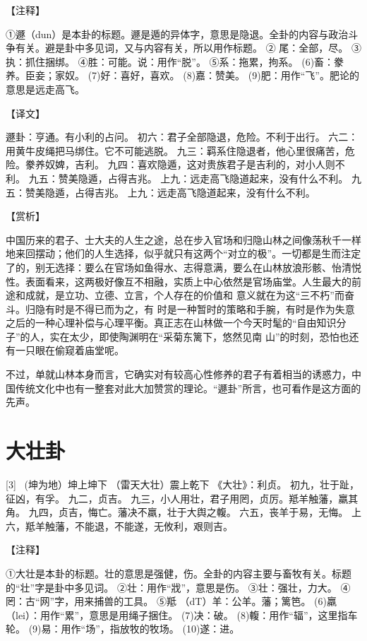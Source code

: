 \documentclass[12pt,UTF8]{ctexbook}
\begin{document}
【注释】

①遯（dun）是本卦的标题。遯是遁的异体字，意思是隐退。全卦的内容与政治斗争有关。避是卦中多见词，又与内容有关，所以用作标题。
② 尾：全部，尽。
③执：抓住捆绑。
④胜：可能。说：用作“脱”。
⑤系：拖累，拘系。
(6)畜：豢养。臣妾；家奴。
(7)好：喜好，喜欢。
(8)嘉：赞美。
(9)肥：用作“飞”。肥论的意思是远走高飞。

【译文】

遯卦：亨通。有小利的占问。
初六：君子全部隐退，危险。不利于出行。
六二：用黄牛皮绳把马绑住。它不可能逃脱。
九三：羁系住隐退者，他心里很痛苦，危险。豢养奴婢，吉利。
九四：喜欢隐遁，这对贵族君子是吉利的，对小人则不利。
九五：赞美隐遁，占得吉兆。
上九：远走高飞隐道起来，没有什么不利。
九五：赞美隐遁，占得吉兆。
上九：远走高飞隐道起来，没有什么不利。

【赏析】

中国历来的君子、士大夫的人生之途，总在步入官场和归隐山林之间像荡秋千一样地来回摆动；他们的人生选择，似乎就只有这两个“对立的极”。一切都是生而注定了的，别无选择：要么在官场如鱼得水、志得意满，要么在山林放浪形骸、怡清悦性。表面看来，这两极好像互不相融，实质上中心依然是官场庙堂。人生最大的前途和成就，是立功、立德、立言，个人存在的价值和 意义就在为这“三不朽”而奋斗。归隐有时是不得已而为之，有 时是一种暂时的策略和手腕，有时是作为失意之后的一种心理补偿与心理平衡。真正志在山林做一个今天时髦的“自由知识分 子”的人，实在太少，即使陶渊明在“采菊东篱下，悠然见南 山”的时刻，恐怕也还有一只眼在偷窥着庙堂呢。

不过，单就山林本身而言，它确实对有较高心性修养的君子有着相当的诱惑力，中国传统文化中也有一整套对此大加赞赏的理论。“遯卦”所言，也可看作是这方面的先声。

\chapter{大壮卦}
[3] \ (坤为地）坤上坤下
（雷天大壮）震上乾下
《大壮》：利贞。
初九，壮于趾，征凶，有孚。
九二，贞吉。
九三，小人用壮，君子用罔，贞厉。羝羊触藩，羸其角。
九四，贞吉，悔亡。藩决不羸，壮于大舆之輹。
六五，丧羊于易，无悔。
上六，羝羊触藩，不能退，不能遂，无攸利，艰则吉。

【注释】

①大壮是本卦的标题。壮的意思是强健，伤。全卦的内容主要与畜牧有关。标题的“壮”字是卦中多见词。
②壮：用作“戕”，意思是伤。
③壮：强壮，力大。
④罔：古“网”字，用来捕兽的工具。
⑤羝 （dT）羊：公羊。藩；篱笆。
(6)羸（lei）：用作“累”，意思是用绳子捆住。
(7)决：破。
(8)輹：用作“辐”，这里指车轮。
(9)易：用作“场”，指放牧的牧场。
(10)遂：进。
\end{document}
